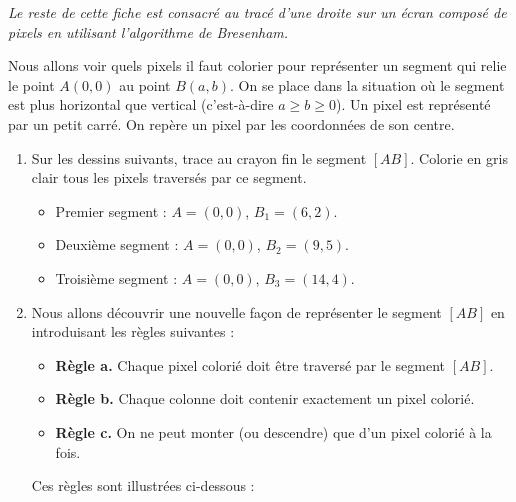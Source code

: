 \documentclass[class=report,crop=false, 12pt]{standalone}
\begin{document}
\bigskip
\bigskip

\emph{Le reste de cette fiche est consacré au tracé d'une droite sur un écran composé de pixels en utilisant l'algorithme de Bresenham.}

\bigskip

Nous allons voir quels pixels il faut colorier pour représenter un segment qui relie le point $A(0,0)$ au point $B(a,b)$. On se place dans la situation où le segment est \og plus horizontal que vertical \fg{} (c'est-à-dire $a \ge b \ge 0$).
Un pixel est représenté par un petit carré. On repère un pixel par les coordonnées de son centre.



\begin{activite}
\sauteligne
\begin{enumerate}
   \item Sur les dessins suivants, trace au crayon fin le segment $[AB]$. Colorie en gris clair tous les pixels traversés par ce segment.
  \begin{itemize}
    \item Premier segment : $A=(0,0)$, $B_1=(6,2)$.
    \item Deuxième segment : $A=(0,0)$, $B_2=(9,5)$.    
    \item Troisième segment : $A=(0,0)$, $B_3=(14,4)$.   
  \end{itemize}  


  \item Nous allons découvrir une nouvelle façon de représenter le segment $[AB]$ en introduisant les règles suivantes :
  
  \begin{itemize}
    \item \textbf{Règle a.} Chaque pixel colorié doit être traversé par le segment $[AB]$.
    \item \textbf{Règle b.} Chaque colonne doit contenir exactement un pixel colorié.
    \item \textbf{Règle c.} On ne peut monter (ou descendre) que d'un pixel colorié à la fois.
  \end{itemize}

Ces règles sont illustrées ci-dessous :



\end{enumerate}
\end{activite}
\end{document}

